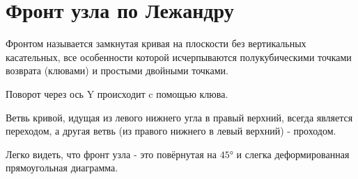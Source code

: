 \section{Фронт узла по Лежандру}

Фронтом называется замкнутая кривая на плоскости без вертикальных касательных, все особенности которой исчерпываются полукубическими точками возврата (клювами) и простыми двойными точками.

Поворот через ось Y происходит c помощью клюва.

Ветвь кривой, идущая из левого нижнего угла в правый верхний, всегда является переходом, а другая ветвь (из правого нижнего в левый верхний) - проходом.

Легко видеть, что фронт узла - это повёрнутая на $45°$ и слегка деформированная прямоугольная диаграмма.